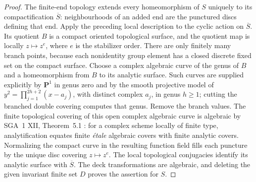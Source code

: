 \begin{proof}
The finite-end topology extends every homeomorphism of $S$ uniquely to
its compactification $\overline S$: neighbourhoods of an added end are the
punctured discs defining that end. Apply the preceding local description
to the cyclic action on $\overline S$. Its quotient $B$ is a compact
oriented topological surface, and the quotient map is locally
$z\mapsto z^e$, where $e$ is the stabilizer order. There are only finitely
many branch points, because each nonidentity group element has a closed
discrete fixed set on the compact surface. Choose a complex algebraic
curve of the genus of $B$ and a homeomorphism from $B$ to its analytic
surface. Such curves are supplied explicitly by $\mathbf P^1$ in genus
zero and by the smooth projective model of
$y^2=\prod_{j=1}^{2h+2}(x-a_j)$, with distinct complex $a_j$, in genus
$h\geq1$; cutting the branched double covering computes that genus.
Remove the branch values. The finite topological covering of this open
complex algebraic curve is algebraic by SGA~1 XII, Theorem~5.1
\cite{SGA1}: for a complex scheme locally of finite type, analytification
equates finite \emph{\'etale} algebraic covers with finite analytic covers.
Normalizing the compact curve in the resulting function field fills each
puncture by the unique disc covering $z\mapsto z^e$. The local
topological conjugacies identify its analytic surface with
$\overline S$. The deck transformations are algebraic, and deleting the
given invariant finite set $D$ proves the assertion for $S$.
\end{proof}

